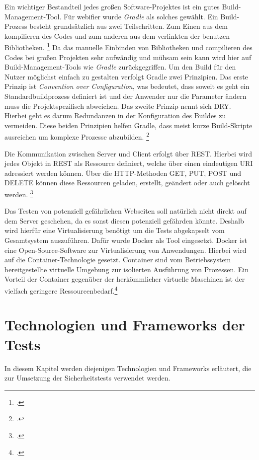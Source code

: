 Ein wichtiger Bestandteil jedes großen Software-Projektes ist ein gutes Build-Management-Tool. Für webifier wurde \textit{Gradle} als solches gewählt. Ein Build-Prozess besteht grundsätzlich aus zwei Teilschritten. Zum Einen aus dem kompilieren des Codes und zum anderen aus dem verlinkten der benutzen Bibliotheken. \footcite[Vgl.][]{buildprozess}
Da das manuelle Einbinden von Bibliotheken und compilieren des Codes bei großen Projekten sehr aufwändig und mühsam sein kann wird hier auf Build-Management-Tools wie \textit{Gradle} zurückgegriffen. Um den Build für den Nutzer möglichst einfach zu gestalten verfolgt Gradle zwei Prinzipien. Das erste Prinzip ist \textit{Convention over Configuration}, was bedeutet, dass soweit es geht ein Standardbuildprozess definiert ist und der Anwender nur die Parameter ändern muss die Projektspezifisch abweichen. Das zweite Prinzip nennt sich \ac{DRY}. Hierbei geht es darum Redundanzen in der Konfiguration des Buildes zu vermeiden. Diese beiden Prinzipien helfen Gradle, dass meist kurze Build-Skripte ausreichen um komplexe Prozesse abzubilden. \footcite[Vgl.][6f]{gradle}

Die Kommunikation zwischen Server und Client erfolgt über \ac{REST}. Hierbei wird jedes Objekt in \ac{REST} als Ressource definiert, welche über einen eindeutigen \ac{URI} adressiert werden können. Über die HTTP-Methoden GET, PUT, POST und DELETE können diese Ressourcen geladen, erstellt, geändert oder auch gelöscht werden. \footcite[Vgl.][]{rest}

Das Testen von potenziell gefährlichen Webseiten soll natürlich nicht direkt auf dem Server geschehen, da es sonst diesen potenziell gefährden könnte. Deshalb wird hierfür eine Virtualisierung benötigt um die Tests abgekapselt vom Gesamtsystem auszuführen. Dafür wurde Docker als Tool eingesetzt. Docker ist eine Open-Source-Software zur Virtualisierung von Anwendungen. Hierbei wird auf die Container-Technologie gesetzt. Container sind vom Betriebssystem bereitgestellte virtuelle Umgebung zur isolierten Ausführung von Prozessen. Ein Vorteil der Container gegenüber der herkömmlicher virtuelle Maschinen ist der vielfach geringere Ressourcenbedarf.\footcite[Vgl.][]{docker}

\section{Technologien und Frameworks der Tests}

In diesem Kapitel werden diejenigen Technologien und Frameworks erläutert, die zur Umsetzung der Sicherheitstests verwendet werden.

